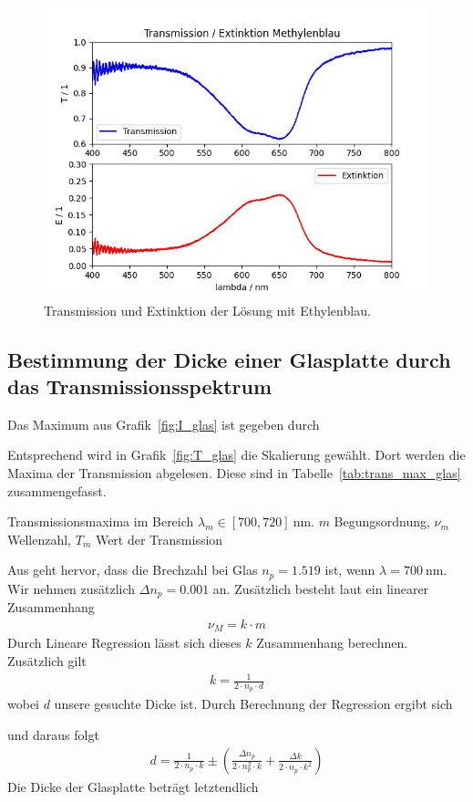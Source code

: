 \documentclass{article}
\begin{document}
\begin{figure}[H]
\centering
\caption{Transmission und Extinktion der Lösung mit Ethylenblau.}
\label{fig:Trans_Ex_Methyl}
\includegraphics[scale=0.7]{Transmission_Extinktion_Methyl.png}

\end{figure}




\subsection{Bestimmung der Dicke einer Glasplatte durch das Transmissionsspektrum}

Das Maximum aus Grafik~\ref{fig:I_glas} ist gegeben durch

Entsprechend wird in Grafik~\ref{fig:T_glas} die Skalierung gewählt. Dort werden die Maxima der Transmission abgelesen. Diese sind in Tabelle~\ref{tab:trans_max_glas} zusammengefasst.

\begin{table}[H]
\centering
\caption{Transmissionsmaxima im Bereich $\lambda_m\in[700,720]~$nm. $m$ Begungsordnung, $\nu_m$ Wellenzahl, $T_m$ Wert der Transmission}
\label{tab:trans_max_glas}

\end{table}

Aus \cite{moodle} geht hervor, dass die Brechzahl bei Glas $n_p = 1.519$ ist, wenn $\lambda=700~$nm. Wir nehmen zusätzlich $\Delta n_p = 0.001$ an.
Zusätzlich besteht laut \cite{moodle} ein linearer Zusammenhang 
\begin{align*}
\nu_M = k\cdot m
\end{align*}
Durch Lineare Regression lässt sich dieses $k$ Zusammenhang berechnen. Zusätzlich gilt
\begin{align*}
k = \frac{1}{2\cdot n_p\cdot d}
\end{align*}
wobei $d$ unsere gesuchte Dicke ist. Durch Berechnung der Regression ergibt sich

und daraus folgt
\begin{align*}
d = \frac{1}{2\cdot n_p\cdot k} \pm \left( \frac{\Delta n_p}{2\cdot n_p^2\cdot k} + \frac{\Delta k}{2\cdot n_p\cdot k^2}\right)
\end{align*}
Die Dicke der Glasplatte beträgt letztendlich

\end{document}
